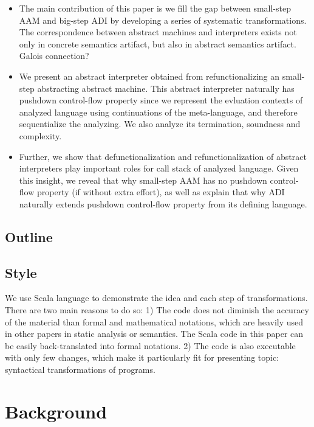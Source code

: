 \documentclass[acmsmall,review,anonymous]{acmart}\settopmatter{printfolios=true,printccs=false,printacmref=false}
\begin{document}
\begin{itemize}
\item The main contribution of this paper is we fill the gap
  between small-step AAM and big-step ADI by developing a series of
  systematic transformations. The correspondence between abstract
  machines and interpreters exists not only in concrete semantics artifact,
  but also in abstract semantics artifact.
  Galois connection?

\item We present an abstract interpreter obtained from refunctionalizing
  an small-step abstracting abstract machine. 
  This abstract interpreter naturally has pushdown control-flow property
  since we represent the evluation contexts of analyzed language using
  continuations of the meta-language, and therefore sequentialize the
  analyzing.
  We also analyze its termination, soundness and complexity.

\item Further, we show that defunctionalization and refunctionalization
  of abstract interpreters play important roles for call stack of analyzed language.
  Given this insight, we reveal that why small-step AAM has no pushdown
  control-flow property (if without extra effort), as well as explain
  that why ADI naturally extends pushdown control-flow property from its
  defining language.

\end{itemize}

\subsection{Outline}

\subsection{Style}

We use Scala language to demonstrate the idea and each step of transformations.
There are two main reasons to do so:
1) The code does not diminish the accuracy of the material
than formal and mathematical notations, 
which are heavily used in other papers in static analysis or semantics.
The Scala code in this paper can be easily back-translated into formal notations.
2) The code is also executable with only few changes, which make it particularly fit for 
presenting topic: syntactical transformations of programs.

\section{Background}
\end{document}
